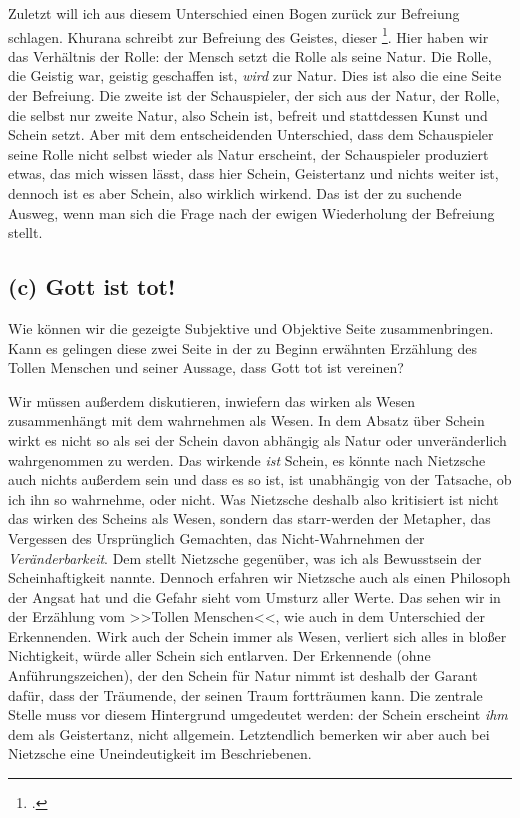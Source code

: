 \documentclass[12pt, a4paper, openany]{report}
\begin{document}
Zuletzt will ich aus diesem Unterschied einen Bogen zurück zur Befreiung schlagen.
Khurana schreibt zur Befreiung des Geistes, dieser \footcite[][393]{khurana_freiheit_2017}. 
Hier haben wir das Verhältnis der Rolle: der Mensch setzt die Rolle als seine Natur. 
Die Rolle, die Geistig war, geistig geschaffen ist, \emph{wird} zur Natur. 
Dies ist also die eine Seite der Befreiung. 
Die zweite ist der Schauspieler, der sich aus der Natur, der Rolle, die selbst nur zweite Natur, also Schein ist, befreit und stattdessen Kunst und Schein setzt. 
Aber mit dem entscheidenden Unterschied, dass dem Schauspieler seine Rolle nicht selbst wieder als Natur erscheint, der Schauspieler produziert etwas, das mich wissen lässt, dass hier Schein, Geistertanz und nichts weiter ist, dennoch ist es aber Schein, also wirklich wirkend.
Das ist der zu suchende Ausweg, wenn man sich die Frage nach der ewigen Wiederholung der Befreiung stellt.

\subsection{(c) Gott ist tot!}
Wie können wir die gezeigte Subjektive und Objektive Seite zusammenbringen. 
Kann es gelingen diese zwei Seite in der zu Beginn erwähnten Erzählung des Tollen Menschen und seiner Aussage, dass Gott tot ist vereinen?

Wir müssen außerdem diskutieren, inwiefern das wirken als Wesen zusammenhängt mit dem wahrnehmen als Wesen. 
In dem Absatz über Schein wirkt es nicht so als sei der Schein davon abhängig als Natur oder unveränderlich wahrgenommen zu werden. 
Das wirkende \emph{ist} Schein, es könnte nach Nietzsche auch nichts außerdem sein und dass es so ist, ist unabhängig von der Tatsache, ob ich ihn so wahrnehme, oder nicht. 
Was Nietzsche deshalb also kritisiert ist nicht das wirken des Scheins als Wesen, sondern das starr-werden der Metapher, das Vergessen des Ursprünglich Gemachten, das Nicht-Wahrnehmen der \emph{Veränderbarkeit}.
Dem stellt Nietzsche gegenüber, was ich als Bewusstsein der Scheinhaftigkeit nannte.
Dennoch erfahren wir Nietzsche auch als einen Philosoph der Angsat hat und die Gefahr sieht vom Umsturz aller Werte. 
Das sehen wir in der Erzählung vom >>Tollen Menschen<<, wie auch in dem Unterschied der Erkennenden. 
Wirk auch der Schein immer als Wesen, verliert sich alles in bloßer Nichtigkeit, würde aller Schein sich entlarven. 
Der Erkennende (ohne Anführungszeichen), der den Schein für Natur nimmt ist deshalb der Garant dafür, dass der Träumende, der  seinen Traum fortträumen kann.
Die zentrale Stelle muss vor diesem Hintergrund umgedeutet werden: 
der Schein erscheint \emph{ihm} dem  als Geistertanz, nicht allgemein.
Letztendlich bemerken wir aber auch bei Nietzsche eine Uneindeutigkeit im Beschriebenen. 
\end{document}
